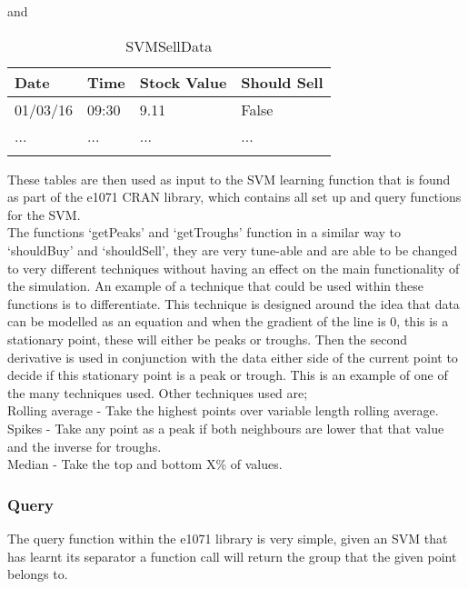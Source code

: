 \documentclass[12pt,a4paper]{article}
\begin{document}
and

\label{units}
\begin{longtable}{ |p{2.25cm}|p{2.25cm}|p{2.25cm}|p{2.25cm}| }\hline\hline
Date & Time & Stock Value & Should Sell \\ \hline
01/03/16 & 09:30 & 9.11 & False  \\ \hline
... & ... & ... & ...  \\ \hline
\caption{SVMSellData}
\end{longtable}

These tables are then used as input to the SVM learning function that is found as part of the e1071 CRAN library, which contains all set up and query functions for the SVM.\\

The functions `getPeaks' and `getTroughs' function in a similar way to `shouldBuy' and `shouldSell', they are very tune-able and are able to be changed to very different techniques without having an effect on the main functionality of the simulation. An example of a technique that could be used within these functions is to differentiate. This technique is designed around the idea that data can be modelled as an equation and when the gradient of the line is 0, this is a stationary point, these will either be peaks or troughs. Then the second derivative is used in conjunction with the data either side of the current point to decide if this stationary point is a peak or trough. This is an example of one of the many techniques used. Other techniques used are; \\

Rolling average - Take the highest points over variable length rolling average. \\
Spikes - Take any point as a peak if both neighbours are lower that that value and the inverse for troughs. \\
Median - Take the top and bottom X\% of values. 

\subsubsection*{Query}

The query function within the e1071 library is very simple, given an SVM that has learnt its separator a function call will return the group that the given point belongs to.
\end{document}
